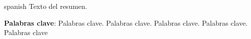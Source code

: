 \begin{resumo}[Resumen]
    \begin{otherlanguage*}{spanish}
        Texto del resumen.\par
        \textbf{Palabras clave}: Palabras clave. Palabras clave. Palabras clave. Palabras clave. Palabras clave
    \end{otherlanguage*}
\end{resumo}